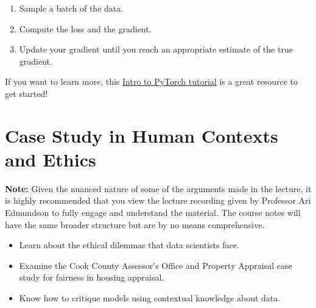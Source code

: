 \documentclass[
  letterpaper,
  DIV=11,
  numbers=noendperiod]{scrreprt}
\providecommand{\tightlist}{%
  \setlength{\itemsep}{0pt}\setlength{\parskip}{0pt}}\usepackage{longtable,booktabs,array}
\begin{document}
\begin{enumerate}
\def\labelenumi{\arabic{enumi}.}
\tightlist
\item
  Sample a batch of the data.
\item
  Compute the loss and the gradient.
\item
  Update your gradient until you reach an appropriate estimate of the
  true gradient.
\end{enumerate}

If you want to learn more, this
\href{https://pytorch.org/tutorials/beginner/deep_learning_60min_blitz.html}{Intro
to PyTorch tutorial} is a great resource to get started!


\chapter{Case Study in Human Contexts and
Ethics}\label{case-study-in-human-contexts-and-ethics}

\textbf{Note:} Given the nuanced nature of some of the arguments made in
the lecture, it is highly recommended that you view the lecture
recording given by Professor Ari Edmundson to fully engage and
understand the material. The course notes will have the same broader
structure but are by no means comprehensive.

\begin{tcolorbox}[enhanced jigsaw, coltitle=black, leftrule=.75mm, left=2mm, bottomrule=.15mm, bottomtitle=1mm, opacityback=0, breakable, arc=.35mm, opacitybacktitle=0.6, toptitle=1mm, title=\textcolor{quarto-callout-note-color}{\faInfo}\hspace{0.5em}{Learning Outcomes}, colbacktitle=quarto-callout-note-color!10!white, titlerule=0mm, rightrule=.15mm, colframe=quarto-callout-note-color-frame, toprule=.15mm, colback=white]

\begin{itemize}
\tightlist
\item
  Learn about the ethical dilemmas that data scientists face.
\item
  Examine the Cook County Assessor's Office and Property Appraisal case
  study for fairness in housing appraisal.
\item
  Know how to critique models using contextual knowledge about data.
\end{itemize}

\end{tcolorbox}
\end{document}
